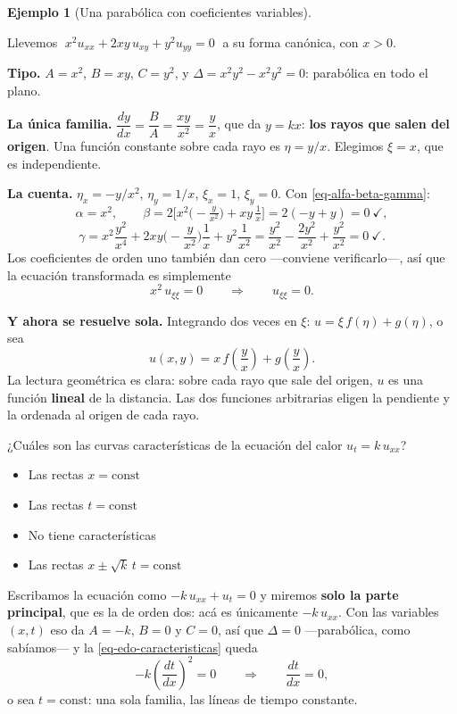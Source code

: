 \documentclass[
  spanish,
  a4paper,
]{scrbook}
\providecommand{\tightlist}{%
  \setlength{\itemsep}{0pt}\setlength{\parskip}{0pt}}
\theoremstyle{definition}
\theoremstyle{plain}
\theoremstyle{definition}
\newtheorem{example}{Ejemplo}[chapter]
\theoremstyle{plain}
\theoremstyle{definition}
\theoremstyle{remark}
\begin{document}
\begin{example}[Una parabólica con coeficientes
variables]\protect\hypertarget{exm-canonica-parabolica}{}\label{exm-canonica-parabolica}

Llevemos \(\;x^2u_{xx} + 2xy\,u_{xy} + y^2u_{yy} = 0\;\) a su forma
canónica, con \(x>0\).

\textbf{Tipo.} \(A=x^2\), \(B=xy\), \(C=y^2\), y
\(\Delta = x^2y^2 - x^2y^2 = 0\): parabólica en todo el plano.

\textbf{La única familia.}
\(\dfrac{dy}{dx} = \dfrac{B}{A} = \dfrac{xy}{x^2} = \dfrac{y}{x}\), que
da \(y = kx\): \textbf{los rayos que salen del origen}. Una función
constante sobre cada rayo es \(\eta = y/x\). Elegimos \(\xi = x\), que
es independiente.

\textbf{La cuenta.} \(\eta_x = -y/x^2\), \(\eta_y = 1/x\),
\(\xi_x = 1\), \(\xi_y = 0\). Con \ref{eq-alfa-beta-gamma}: \[
\alpha = x^2, \qquad
\beta = 2\Big[x^2\big(-\tfrac{y}{x^2}\big) + xy\,\tfrac1x\Big] = 2(-y+y) = 0 \ \checkmark,
\] \[
\gamma = x^2\frac{y^2}{x^4} + 2xy\Big(-\frac{y}{x^2}\Big)\frac1x + y^2\frac1{x^2}
= \frac{y^2}{x^2} - \frac{2y^2}{x^2} + \frac{y^2}{x^2} = 0 \ \checkmark .
\] Los coeficientes de orden uno también dan cero ---conviene
verificarlo---, así que la ecuación transformada es simplemente \[
x^2\,u_{\xi\xi} = 0 \qquad\Longrightarrow\qquad u_{\xi\xi} = 0 .
\]

\textbf{Y ahora se resuelve sola.} Integrando dos veces en \(\xi\):
\(u = \xi\,f(\eta) + g(\eta)\), o sea \[
u(x,y) = x\,f\!\left(\frac{y}{x}\right) + g\!\left(\frac{y}{x}\right) .
\] La lectura geométrica es clara: sobre cada rayo que sale del origen,
\(u\) es una función \textbf{lineal} de la distancia. Las dos funciones
arbitrarias eligen la pendiente y la ordenada al origen de cada rayo.

\end{example}

¿Cuáles son las curvas características de la ecuación del calor
\(u_t = k\,u_{xx}\)?

\begin{itemize}
\tightlist
\item
  {Las rectas \(x = \text{const}\)}
\item
  {Las rectas \(t = \text{const}\)}
\item
  {No tiene características}
\item
  {Las rectas \(x \pm \sqrt{k}\,t = \text{const}\)}
\end{itemize}

Escribamos la ecuación como \(-k\,u_{xx} + u_t = 0\) y miremos
\textbf{solo la parte principal}, que es la de orden dos: acá es
únicamente \(-k\,u_{xx}\). Con las variables \((x,t)\) eso da \(A=-k\),
\(B=0\) y \(C=0\), así que \(\Delta = 0\) ---parabólica, como
sabíamos--- y la \ref{eq-edo-caracteristicas} queda
\[-k\left(\frac{dt}{dx}\right)^2 = 0 \qquad\Longrightarrow\qquad \frac{dt}{dx} = 0,\]
o sea \(t = \text{const}\): una sola familia, las líneas de tiempo
constante.
\end{document}
